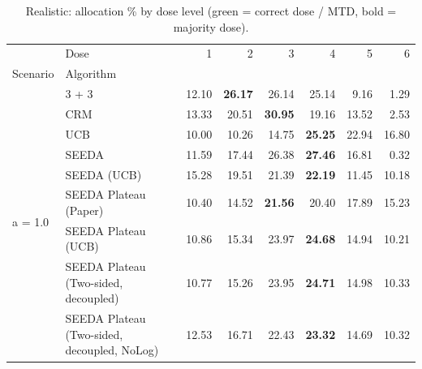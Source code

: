 \begin{table}[H]
\centering
\caption{Realistic: allocation \% by dose level (green = correct dose / MTD, bold = majority dose).}
\label{tab:real_alloc_by_dose}
\begin{tabular}{llrrrrrr}
\toprule
 & Dose & 1 & 2 & 3 & 4 & 5 & 6 \\
Scenario & Algorithm &  &  &  &  &  &  \\
\midrule
\multirow[c]{9}{*}{a = 1.0} & 3 + 3 & 12.10 & \bfseries 26.17 & {\cellcolor[HTML]{C8E6C9}} 26.14 & 25.14 & 9.16 & 1.29 \\
 & CRM & 13.33 & 20.51 & {\cellcolor[HTML]{C8E6C9}} \bfseries 30.95 & 19.16 & 13.52 & 2.53 \\
 & UCB & 10.00 & 10.26 & {\cellcolor[HTML]{C8E6C9}} 14.75 & \bfseries 25.25 & 22.94 & 16.80 \\
 & SEEDA & 11.59 & 17.44 & {\cellcolor[HTML]{C8E6C9}} 26.38 & \bfseries 27.46 & 16.81 & 0.32 \\
 & SEEDA (UCB) & 15.28 & 19.51 & {\cellcolor[HTML]{C8E6C9}} 21.39 & \bfseries 22.19 & 11.45 & 10.18 \\
 & SEEDA Plateau (Paper) & 10.40 & 14.52 & {\cellcolor[HTML]{C8E6C9}} \bfseries 21.56 & 20.40 & 17.89 & 15.23 \\
 & SEEDA Plateau (UCB) & 10.86 & 15.34 & {\cellcolor[HTML]{C8E6C9}} 23.97 & \bfseries 24.68 & 14.94 & 10.21 \\
 & SEEDA Plateau (Two-sided, decoupled) & 10.77 & 15.26 & {\cellcolor[HTML]{C8E6C9}} 23.95 & \bfseries 24.71 & 14.98 & 10.33 \\
 & SEEDA Plateau (Two-sided, decoupled, NoLog) & 12.53 & 16.71 & {\cellcolor[HTML]{C8E6C9}} 22.43 & \bfseries 23.32 & 14.69 & 10.32 \\
\bottomrule
\end{tabular}
\end{table}
